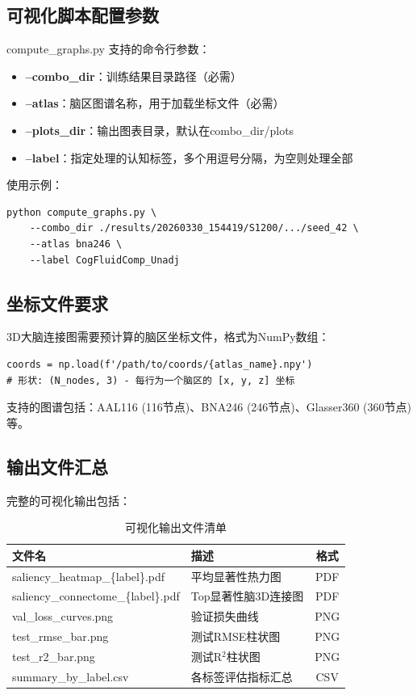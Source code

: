 \subsection{可视化脚本配置参数}

compute\_graphs.py 支持的命令行参数：

\begin{itemize}
    \item \textbf{--combo\_dir}：训练结果目录路径（必需）
    \item \textbf{--atlas}：脑区图谱名称，用于加载坐标文件（必需）
    \item \textbf{--plots\_dir}：输出图表目录，默认在combo\_dir/plots
    \item \textbf{--label}：指定处理的认知标签，多个用逗号分隔，为空则处理全部
\end{itemize}

使用示例：

\begin{verbatim}
python compute_graphs.py \
    --combo_dir ./results/20260330_154419/S1200/.../seed_42 \
    --atlas bna246 \
    --label CogFluidComp_Unadj
\end{verbatim}

\subsection{坐标文件要求}

3D大脑连接图需要预计算的脑区坐标文件，格式为NumPy数组：

\begin{verbatim}
coords = np.load(f'/path/to/coords/{atlas_name}.npy')
# 形状: (N_nodes, 3) - 每行为一个脑区的 [x, y, z] 坐标
\end{verbatim}

支持的图谱包括：AAL116 (116节点)、BNA246 (246节点)、Glasser360 (360节点)等。

\subsection{输出文件汇总}

完整的可视化输出包括：

\begin{table}[htbp]
\centering
\caption{可视化输出文件清单}
\label{tab:output_files}
\begin{tabular}{llc}
\toprule
文件名 & 描述 & 格式 \\
\midrule
saliency\_heatmap\_\{label\}.pdf & 平均显著性热力图 & PDF \\
saliency\_connectome\_\{label\}.pdf & Top显著性脑3D连接图 & PDF \\
val\_loss\_curves.png & 验证损失曲线 & PNG \\
test\_rmse\_bar.png & 测试RMSE柱状图 & PNG \\
test\_r2\_bar.png & 测试R$^2$柱状图 & PNG \\
summary\_by\_label.csv & 各标签评估指标汇总 & CSV \\
\bottomrule
\end{tabular}
\end{table}

